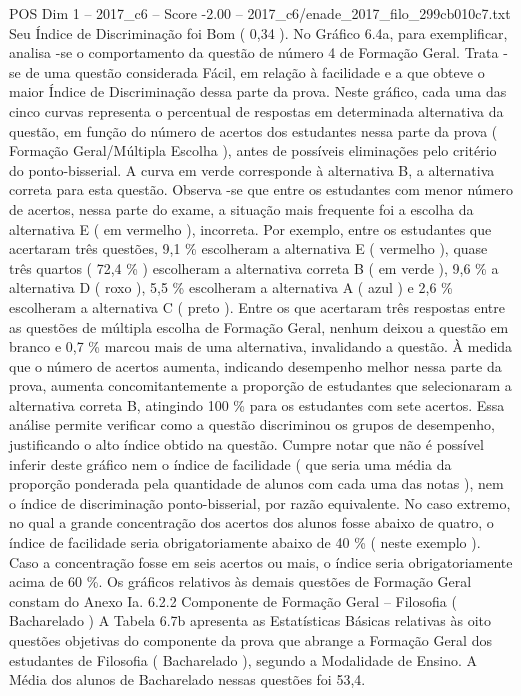 \begin{textsample}{POS Dim 1 – 2017\_c6 – Score -2.00 – 2017\_c6/enade\_2017\_filo\_299cb010c7.txt}
Seu Índice de Discriminação foi Bom ( 0,34 ).
No Gráfico 6.4a, para exemplificar, analisa -se o comportamento da questão de número 4 de Formação Geral.
Trata -se de uma questão considerada Fácil, em relação à facilidade e a que obteve o maior Índice de Discriminação dessa parte da prova.
Neste gráfico, cada uma das cinco curvas representa o percentual de respostas em determinada alternativa da questão, em função do número de acertos dos estudantes nessa parte da prova ( Formação Geral/Múltipla Escolha ), antes de possíveis eliminações pelo critério do ponto-bisserial.
A curva em verde corresponde à alternativa B, a alternativa correta para esta questão.
Observa -se que entre os estudantes com menor número de acertos, nessa parte do exame, a situação mais frequente foi a escolha da alternativa E ( em vermelho ), incorreta.
Por exemplo, entre os estudantes que acertaram três questões, 9,1 \% escolheram a alternativa E ( vermelho ), quase três quartos ( 72,4 \% ) escolheram a alternativa correta B ( em verde ), 9,6 \% a alternativa D ( roxo ), 5,5 \% escolheram a alternativa A ( azul ) e 2,6 \% escolheram a alternativa C ( preto ).
Entre os que acertaram três respostas entre as questões de múltipla escolha de Formação Geral, nenhum deixou a questão em branco e 0,7 \% marcou mais de uma alternativa, invalidando a questão.
À medida que o número de acertos aumenta, indicando desempenho melhor nessa parte da prova, aumenta concomitantemente a proporção de estudantes que selecionaram a alternativa correta B, atingindo 100 \% para os estudantes com sete acertos.
Essa análise permite verificar como a questão discriminou os grupos de desempenho, justificando o alto índice obtido na questão.
Cumpre notar que não é possível inferir deste gráfico nem o índice de facilidade ( que seria uma média da proporção ponderada pela quantidade de alunos com cada uma das notas ), nem o índice de discriminação ponto-bisserial, por razão equivalente.
No caso extremo, no qual a grande concentração dos acertos dos alunos fosse abaixo de quatro, o índice de facilidade seria obrigatoriamente abaixo de 40 \% ( neste exemplo ).
Caso a concentração fosse em seis acertos ou mais, o índice seria obrigatoriamente acima de 60 \%.
Os gráficos relativos às demais questões de Formação Geral constam do Anexo Ia. 6.2.2 Componente de Formação Geral – Filosofia ( Bacharelado ) A Tabela 6.7b apresenta as Estatísticas Básicas relativas às oito questões objetivas do componente da prova que abrange a Formação Geral dos estudantes de Filosofia ( Bacharelado ), segundo a Modalidade de Ensino.
A Média dos alunos de Bacharelado nessas questões foi 53,4.

\end{textsample}
